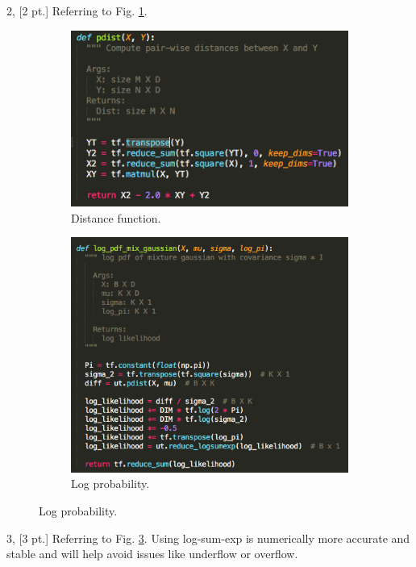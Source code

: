 \documentclass[12pt,letterpaper]{article}
\begin{document}
2, [2 pt.] Referring to Fig. \ref{dist_func}.
\begin{figure}
\centering
    \begin{subfigure}[b]{0.45\textwidth}
        \includegraphics[width=\textwidth]{imgs/GMM_2_1_2.png}
        \caption{Distance function.}
        \label{dist_func}
    \end{subfigure}
    \begin{subfigure}[b]{0.45\textwidth}
        \includegraphics[width=\textwidth]{imgs/GMM_2_1_3.png}
        \caption{Log probability.}
        \label{log_prob}
    \end{subfigure}
\end{figure}

3, [3 pt.] Referring to Fig. \ref{log_prob}. Using log-sum-exp is numerically more accurate and stable and will help avoid issues like underflow or overflow.
\end{document}
